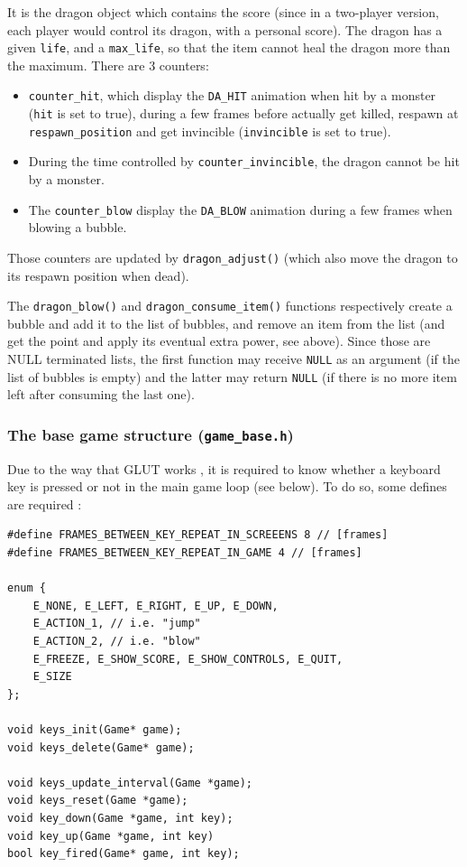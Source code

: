 \documentclass[12pt,a4paper]{article}
\newcommand{\cc}[1]{\texttt{#1}}
\begin{document}
It is the dragon object which contains the score (since in a two-player version, each player would control its dragon, with a personal score). The dragon has a given \cc{life}, and a \cc{max_life}, so that the item cannot heal the dragon more than the maximum. There are 3 counters:\begin{itemize}
\item \cc{counter_hit}, which display the \cc{DA_HIT} animation when hit by a monster (\cc{hit} is set to true), during a few frames before actually get killed, respawn at \cc{respawn_position} and get invincible (\cc{invincible} is set to true).
\item  During the time controlled by \cc{counter_invincible}, the dragon cannot be hit by a monster.
\item The \cc{counter_blow} display the \cc{DA_BLOW} animation during a few frames when blowing a bubble.
\end{itemize}
Those counters are updated by \cc{dragon_adjust()} (which also move the dragon to its respawn position when dead).

The \cc{dragon_blow()} and \cc{dragon_consume_item()} functions respectively create a bubble and add it to the list of bubbles, and remove an item from the list (and get the point and apply its eventual extra power, see above). Since those are NULL terminated lists, the first function may receive \cc{NULL} as an argument (if the list of bubbles is empty) and the latter may return \cc{NULL} (if there is no more item left after consuming the last one).

\subsubsection{The base game structure (\texttt{game\_base.h})}

\label{p:ekey}Due to the way that GLUT works \cite{freeglut},  it is required to know whether a keyboard key is pressed or not in the main game loop (see below). To do so, some defines are required :\begin{verbatim}
#define FRAMES_BETWEEN_KEY_REPEAT_IN_SCREEENS 8 // [frames]
#define FRAMES_BETWEEN_KEY_REPEAT_IN_GAME 4 // [frames]

enum {
    E_NONE, E_LEFT, E_RIGHT, E_UP, E_DOWN,
    E_ACTION_1, // i.e. "jump"
    E_ACTION_2, // i.e. "blow"
    E_FREEZE, E_SHOW_SCORE, E_SHOW_CONTROLS, E_QUIT,
    E_SIZE
};

void keys_init(Game* game);
void keys_delete(Game* game);

void keys_update_interval(Game *game);
void keys_reset(Game *game);
void key_down(Game *game, int key);
void key_up(Game *game, int key)
bool key_fired(Game* game, int key);
\end{verbatim}
\end{document}
